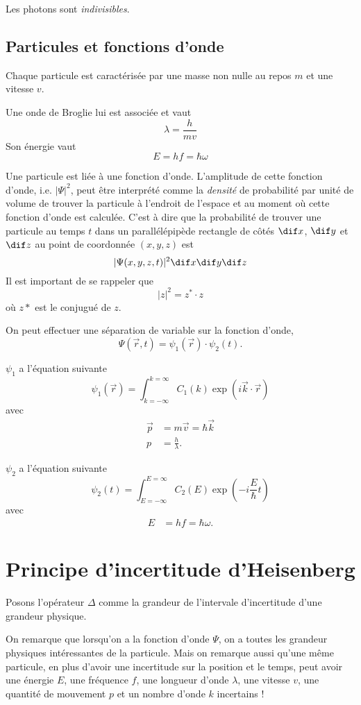 Les photons sont \emph{indivisibles}.

\subsection{Particules et fonctions d'onde}
Chaque particule est caractérisée par une masse non nulle au repos $m$
et une vitesse $v$.

Une onde de Broglie lui est associée et vaut
\[ \lambda = \frac{h}{mv} \]
Son énergie vaut
\[ E = hf = \hbar \omega \]

Une particule est liée à une fonction d'onde.
L'amplitude de cette fonction d'onde, i.e. $|\Psi|^2$, peut être interprété
comme la \emph{densité} de probabilité par unité de volume de trouver
la particule à l'endroit de l'espace et au moment où cette fonction
d'onde est calculée.
C'est à dire que la probabilité de trouver une particule
au temps $t$ dans un parallélépipède rectangle de côtés
$\dif x$, $\dif y$ et $\dif z$ au point de coordonnée $(x, y, z)$ est
\[ |\Psi(x, y, z, t)|^2 \dif x \dif y \dif z \]
Il est important de se rappeler que
\[ |z|^2 = z^{*} \cdot z \]
où $z*$ est le conjugué de $z$.

On peut effectuer une séparation de variable sur la fonction d'onde,
\[ \Psi(\vec{r}, t) = \psi_1(\vec{r}) \cdot \psi_2(t). \]

$\psi_1$ a l'équation suivante
\[ \psi_1(\vec{r}) = \int_{k=-\infty}^{k=\infty}
C_1(k) \exp\left(i\vec{k}\cdot\vec{r}\right) \]
avec
\begin{align}
  \label{eq:pvk}
  \vec{p} & = m\vec{v} = \hbar \vec{k}\\
  \nonumber
  p & = \frac{h}{\lambda}.
\end{align}

$\psi_2$ a l'équation suivante
\[ \psi_2(t) = \int_{E=-\infty}^{E=\infty}
C_2(E) \exp\left(-i \frac{E}{\hbar} t\right) \]
avec
\begin{align}
  \label{eq:Ef}
  E & = hf = \hbar\omega.
\end{align}

\section{Principe d'incertitude d'Heisenberg}
\begin{mynota}
  Posons l'opérateur $\Delta$ comme
  la grandeur de l'intervale d'incertitude
  d'une grandeur physique.
\end{mynota}

On remarque que lorsqu'on a la fonction d'onde $\Psi$,
on a toutes les grandeur physiques intéressantes de la particule.
Mais on remarque aussi qu'une même particule,
en plus d'avoir une incertitude sur la position et le temps,
peut avoir une énergie $E$, une fréquence $f$,
une longueur d'onde $\lambda$, une vitesse $v$,
une quantité de mouvement $p$ et un nombre d'onde $k$ incertains !


